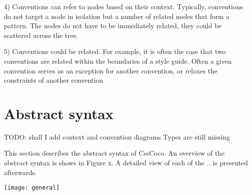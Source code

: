 \documentclass[parskip=full]{uvamscse}
\begin{document}
4) Conventions can refer to nodes based on their context. Typically, conventions do not target a
node in isolation but a number of related nodes that form a pattern. The nodes do not have to be
immediately related, they could be scattered across the tree.

5) Conventions could be related. For example, it is often the case that two conventions are related
within the boundaries of a style guide. Often a given convention serves as an exception for another
convention, or relaxes the constraints of another convention.


\section{Abstract syntax}

TODO: shall I add context and convention diagrams
Types are still missing

This section describes the abstract syntax of CssCoco. An overview of the abstract syntax is shows in Figure x. A detailed view of each of the .. is presented afterwards.

\texttt{[image: general]}
\end{document}
